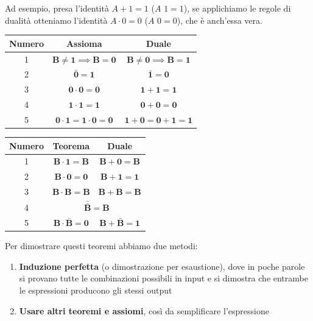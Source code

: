\documentclass[11pt, a4paper, titlepage, oneside]{scrbook}
\begin{document}
Ad esempio, presa l'identità $A + 1 = 1$ ($A$  $1 = 1$), se applichiamo le regole di dualità otteniamo l'identità $A \cdot 0 = 0$ ($A$  $0 = 0$), che è anch'essa vera.  

\begin{Proprieta}[Assiomi]
\label{prop-assiomi}
\begin{center}
\begin{tabular}{|c|c|c|}
    \hline
    \textbf{Numero} & \textbf{Assioma} & \textbf{Duale} \\
    \hline
    1 &$\bm{B \neq 1} \implies \bm{B = 0}$ & $\bm{B \neq 0} \implies \bm{B = 1}$ \\
    \hline
    2 & $\bm{\bar{0} = 1}$ & $\bm{\bar{1} = 0}$ \\
    \hline
    3 & $\bm{0 \cdot 0 = 0}$ & $\bm{1 + 1 = 1}$ \\
    \hline
    4 & $\bm{1 \cdot 1 = 1}$ & $\bm{0 + 0 = 0}$ \\
    \hline
    5 &$\bm{0 \cdot 1 = 1 \cdot 0 = 0}$ & $\bm{1 + 0 = 0 + 1 = 1}$ \\
    \hline
\end{tabular}
\end{center}
\end{Proprieta}

\begin{Proprieta}
\label{prop-teoremi-una-variabile}
\begin{center}
\begin{tabular}{|c|c|c|}
    \hline
    \textbf{Numero} & \textbf{Teorema} & \textbf{Duale} \\
    \hline
    1 & $\bm{B \cdot 1 = B}$ & $\bm{B + 0 = B}$ \\
    \hline
    2 & $\bm{B \cdot 0 = 0}$ & $\bm{B + 1 = 1}$ \\
    \hline
    3 & $\bm{B \cdot B = B}$ & $\bm{B + B  = B}$ \\
    \hline
    4 & \multicolumn{2}{c|}{\rule[-1.2ex]{0pt}{4ex} $\bar{\bar{\bm{B}}} \bm{= B}$} \\
    \hline
    5 & $\bm{B \cdot \bar{B} = 0}$ & $\bm{B + \bar{B} = 1}$ \\
    \hline
\end{tabular}
\end{center}
\end{Proprieta}

Per dimostrare questi teoremi abbiamo due metodi:
\begin{enumerate}
    \item \textbf{Induzione perfetta} (o dimostrazione per esaustione), dove in poche parole si provano tutte le combinazioni possibili in input e si dimostra che entrambe le espressioni producono gli stessi output
    \item \textbf{Usare altri teoremi e assiomi}, così da semplificare l'espressione
\end{enumerate}
\end{document}
